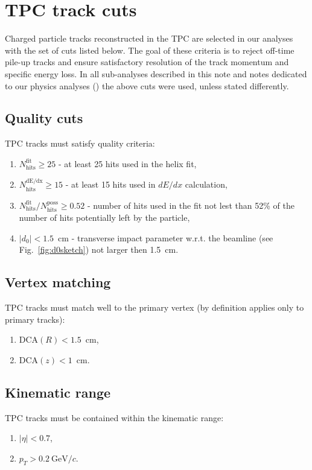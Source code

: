 

\chapter{TPC track cuts}\label{chap:TpcTrackQualityCuts}

Charged particle tracks reconstructed in the TPC are selected in our analyses with the set of cuts listed below. The goal of these criteria is to reject off-time pile-up tracks and ensure satisfactory resolution of the track momentum and specific energy loss. In all sub-analyses described in this note and notes dedicated to our physics analyses (\cite{AnalysisNoteRafal,AnalysisNoteLukasz}) the above cuts were used, unless stated differently.

\section{Quality cuts}\label{enum:TpcQualityCuts}
TPC tracks must satisfy quality criteria:
\begin{enumerate}
\item $N_{\textrm{hits}}^{\textrm{fit}}\geq25$ - at least 25 hits used in the helix fit,
\item $N_{\textrm{hits}}^{\textrm{dE/dx}}\geq15$ - at least 15 hits used in $dE/dx$ calculation,
\item $N_{\textrm{hits}}^{\textrm{fit}}/N_{\textrm{hits}}^{\textrm{poss}}\geq0.52$ - number of hits used in the fit not lest than 52\% of the number of hits potentially left by the particle,
\item $|d_{0}|<1.5$~cm - transverse impact parameter w.r.t. the beamline (see Fig.~\ref{fig:d0sketch}) not larger then 1.5~cm.
\end{enumerate}
\section{Vertex matching}\label{enum:TpcDcaCuts}
TPC tracks must match well to the primary vertex (by definition applies only to primary tracks):
\begin{enumerate}
 \item $\textrm{DCA}(R)<1.5$~cm,
 \item $\textrm{DCA}(z)<1$~cm.
 \end{enumerate}
\section{Kinematic range}\label{enum:TpcKinematicCuts}
TPC tracks must be contained within the kinematic range:
\begin{enumerate}
\item $|\eta|<0.7$,
\item $p_{T}>0.2~\textrm{GeV}/c$.
\end{enumerate}